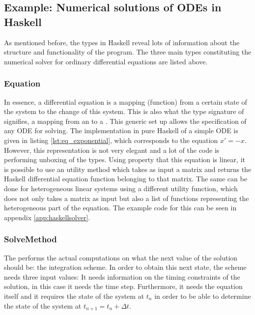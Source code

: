 \subsection{Example: Numerical solutions of ODEs in Haskell}

As mentioned before, the types in Haskell reveal lots of information about the structure and functionality of the program. The three main types constituting the numerical solver for ordinary differential equations are listed above.



\subsubsection{Equation}
In essence, a differential equation is a mapping (function) from a certain state of the system to the change of this system. This is also what the type signature of  signifies, a mapping from an  to a . This generic set up allows the specification of any ODE for solving. The implementation in pure Haskell of a simple ODE is given in listing \ref{lst:eq_exponential}, which corresponds to the equation $x' = -x$. However, this representation is not very elegant and a lot of the code is performing unboxing of the types. Using property that this equation is linear, it is possible to use an utility method which takes as input a matrix and returns the Haskell differential equation function belonging to that matrix. The same can be done for heterogeneous linear systems using a different utility function, which does not only takes a matrix as input but also a list of functions representing the heterogeneous part of the equation. The example code for this can be seen in appendix \ref{app:haskellsolver}.



\subsubsection{SolveMethod}
The  performs the actual computations on what the next value of the solution should be: the integration scheme. In order to obtain this next state, the scheme needs three input values: It needs information on the timing constraints of the solution, in this case it needs the time step. Furthermore, it needs the equation itself and it requires the state of the system at $t_{n}$ in order to be able to determine the state of the system at $t_{n+1} = t_{n} + \Delta t$.

